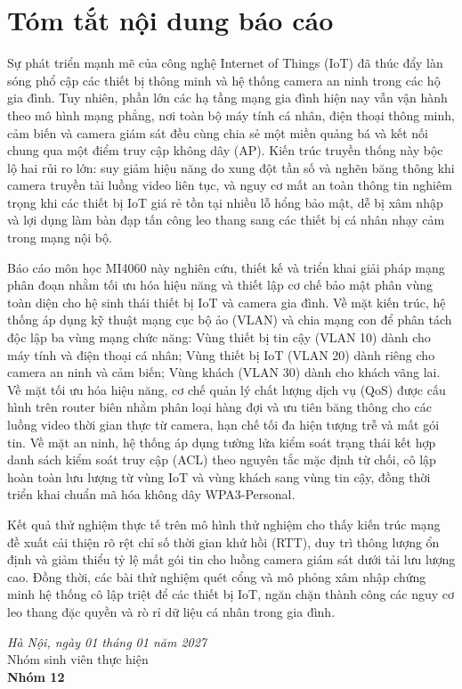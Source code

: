 \chapter*{Tóm tắt nội dung báo cáo}

Sự phát triển mạnh mẽ của công nghệ Internet of Things (IoT) đã thúc đẩy làn sóng phổ cập các thiết bị thông minh và hệ thống camera an ninh trong các hộ gia đình. Tuy nhiên, phần lớn các hạ tầng mạng gia đình hiện nay vẫn vận hành theo mô hình mạng phẳng, nơi toàn bộ máy tính cá nhân, điện thoại thông minh, cảm biến và camera giám sát đều cùng chia sẻ một miền quảng bá và kết nối chung qua một điểm truy cập không dây (AP). Kiến trúc truyền thống này bộc lộ hai rủi ro lớn: suy giảm hiệu năng do xung đột tần số và nghẽn băng thông khi camera truyền tải luồng video liên tục, và nguy cơ mất an toàn thông tin nghiêm trọng khi các thiết bị IoT giá rẻ tồn tại nhiều lỗ hổng bảo mật, dễ bị xâm nhập và lợi dụng làm bàn đạp tấn công leo thang sang các thiết bị cá nhân nhạy cảm trong mạng nội bộ.

Báo cáo môn học MI4060 này nghiên cứu, thiết kế và triển khai giải pháp mạng phân đoạn nhằm tối ưu hóa hiệu năng và thiết lập cơ chế bảo mật phân vùng toàn diện cho hệ sinh thái thiết bị IoT và camera gia đình. Về mặt kiến trúc, hệ thống áp dụng kỹ thuật mạng cục bộ ảo (VLAN) và chia mạng con để phân tách độc lập ba vùng mạng chức năng: Vùng thiết bị tin cậy (VLAN 10) dành cho máy tính và điện thoại cá nhân; Vùng thiết bị IoT (VLAN 20) dành riêng cho camera an ninh và cảm biến; Vùng khách (VLAN 30) dành cho khách vãng lai. Về mặt tối ưu hóa hiệu năng, cơ chế quản lý chất lượng dịch vụ (QoS) được cấu hình trên router biên nhằm phân loại hàng đợi và ưu tiên băng thông cho các luồng video thời gian thực từ camera, hạn chế tối đa hiện tượng trễ và mất gói tin. Về mặt an ninh, hệ thống áp dụng tường lửa kiểm soát trạng thái kết hợp danh sách kiểm soát truy cập (ACL) theo nguyên tắc mặc định từ chối, cô lập hoàn toàn lưu lượng từ vùng IoT và vùng khách sang vùng tin cậy, đồng thời triển khai chuẩn mã hóa không dây WPA3-Personal.

Kết quả thử nghiệm thực tế trên mô hình thử nghiệm cho thấy kiến trúc mạng đề xuất cải thiện rõ rệt chỉ số thời gian khứ hồi (RTT), duy trì thông lượng ổn định và giảm thiểu tỷ lệ mất gói tin cho luồng camera giám sát dưới tải lưu lượng cao. Đồng thời, các bài thử nghiệm quét cổng và mô phỏng xâm nhập chứng minh hệ thống cô lập triệt để các thiết bị IoT, ngăn chặn thành công các nguy cơ leo thang đặc quyền và rò rỉ dữ liệu cá nhân trong gia đình.

\vspace{-3mm}
\hspace{0.5\textwidth}
\begin{minipage}{0.5\textwidth}
	\noindent\begin{center}
		\vspace{1cm}
		\textit{Hà Nội, ngày 01 tháng 01 năm 2027} \\
		Nhóm sinh viên thực hiện\\ \vspace{1.5cm}
		\textbf{Nhóm 12}
	\end{center}	
\end{minipage}
